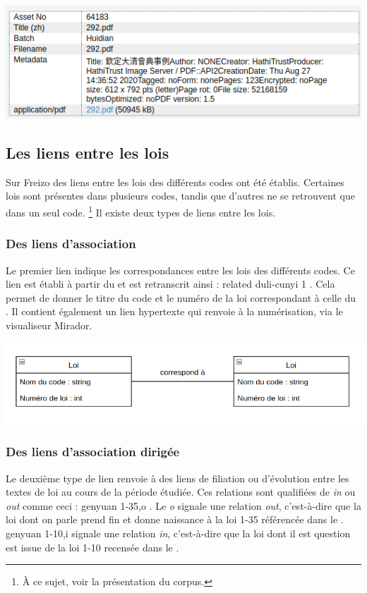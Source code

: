 \noindent \includegraphics[width=\textwidth]{images/annexe6.png}

\subsection*{Les liens entre les lois}
Sur Freizo des liens entre les lois des différents codes ont été établis. Certaines lois sont présentes dans plusieurs codes, tandis que d’autres ne se retrouvent que dans un seul code. \footnote{À ce sujet, voir la présentation du corpus.} Il existe deux types de liens entre les lois.

\subsubsection{Des liens d'association}
Le premier lien indique les correspondances entre les lois des différents codes. Ce lien est établi à partir du \genyuan et est retranscrit ainsi : \og related duli-cunyi 1 \fg. Cela permet de donner le titre du code et le numéro de la loi correspondant à celle du \genyuan. Il contient également un lien hypertexte qui renvoie à la numérisation, via le visualiseur Mirador. 

\noindent \includegraphics[width=\textwidth]{images/image4.png}

\subsubsection{Des liens d'association dirigée}
Le deuxième type de lien renvoie à des liens de filiation ou d'évolution entre les textes de loi au cours de la période étudiée. Ces relations sont qualifiées de \og \textit{in} \fg ou \og \textit{out} \fg comme ceci : 
 \og genyuan 1-35,o \fg. Le \textit{o} signale une relation \textit{out}, c’est-à-dire que la loi dont on parle prend fin et donne naissance à la loi 1-35 référencée dans le \genyuan. \og genyuan 1-10,i \fg signale une relation \textit{in}, c’est-à-dire que la loi dont il est question est issue de la loi 1-10 recensée dans le \genyuan. 

